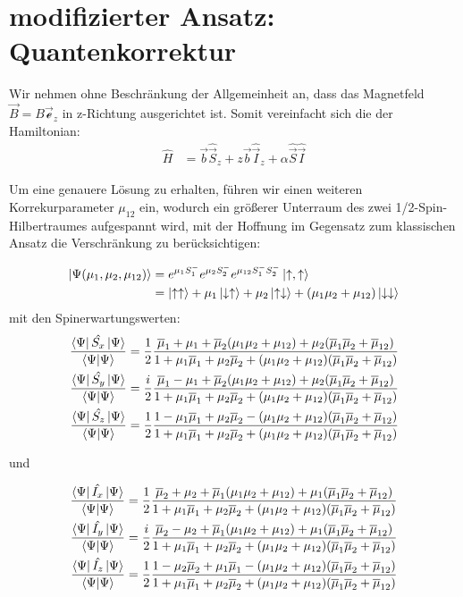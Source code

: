 \section{modifizierter Ansatz: Quantenkorrektur}

\noindent Wir nehmen ohne Beschränkung der Allgemeinheit an, dass das Magnetfeld $\vec{B}=B\vec{\mathcal{e}}_z$ in z-Richtung ausgerichtet ist. Somit vereinfacht sich die der Hamiltonian:
\begin{align}
    \hat{H} &= \vec{b}\hat{\vec{S}}_z +  z\vec{b}\hat{\vec{I}}_z + \alpha \hat{\vec{S}}\hat{\vec{I}}
\end{align}


\noindent Um eine genauere Lösung zu erhalten, führen wir einen weiteren Korrekurparameter $\mu_{12}$ ein, wodurch ein größerer Unterraum des zwei 1/2-Spin-Hilbertraumes aufgespannt wird, mit der Hoffnung im Gegensatz zum klassischen Ansatz die Verschränkung zu berücksichtigen:


\begin{align}
    \ket{\Psi(\mu_1,\mu_2,\mu_{12})} &= e^{\mu_1 S_1^-}e^{\mu_2 S_2^-}e^{\mu_{12} S_1^-S_2^-}\ket{\uparrow,\uparrow}\\
                                    &= \ket{\uparrow \uparrow} +\mu_1\ket{\downarrow \uparrow} + \mu_2\ket{\uparrow \downarrow} + (\mu_1\mu_2 + \mu_{12})\ket{\downarrow \downarrow}
\end{align}
mit den Spinerwartungswerten:
\begin{align}
    \frac{\bra{\Psi}\hat{S_x}\ket{\Psi}}{\bra{\Psi}\ket{\Psi}} &= \frac{1}{2}\frac{\overline{\mu}_1 + \mu_1 + \overline{\mu}_2(\mu_1\mu_2 + \mu_{12}) + \mu_2(\overline{\mu}_1\overline{\mu}_2 + \overline{\mu}_{12})}{1+\mu_1\overline{\mu}_1 + \mu_2\overline{\mu}_2 + (\mu_1\mu_2 + \mu_{12})(\overline{\mu}_1\overline{\mu}_2 + \overline{\mu}_{12})} \\
    \frac{\bra{\Psi}\hat{S_y}\ket{\Psi}}{\bra{\Psi}\ket{\Psi}} &= \frac{i}{2}\frac{\overline{\mu}_1 - \mu_1 + \overline{\mu}_2(\mu_1\mu_2 + \mu_{12}) + \mu_2(\overline{\mu}_1\overline{\mu}_2 + \overline{\mu}_{12})}{1+\mu_1\overline{\mu}_1 + \mu_2\overline{\mu}_2 + (\mu_1\mu_2 + \mu_{12})(\overline{\mu}_1\overline{\mu}_2 + \overline{\mu}_{12})}\\
    \frac{\bra{\Psi}\hat{S_z}\ket{\Psi}}{\bra{\Psi}\ket{\Psi}} &= \frac{1}{2}\frac{1 - \mu_1\overline{\mu}_1 + \mu_2\overline{\mu}_2 - (\mu_1\mu_2 + \mu_{12})(\overline{\mu}_1\overline{\mu}_2 + \overline{\mu}_{12})}{1 + \mu_1\overline{\mu}_1 + \mu_2\overline{\mu}_2 + (\mu_1\mu_2 + \mu_{12})(\overline{\mu}_1\overline{\mu}_2 + \overline{\mu}_{12})}  
\end{align}

und

\begin{align}
    \frac{\bra{\Psi}\hat{I_x}\ket{\Psi}}{\bra{\Psi}\ket{\Psi}} &= \frac{1}{2}\frac{\overline{\mu}_2 + \mu_2 + \overline{\mu}_1(\mu_1\mu_2 + \mu_{12}) + \mu_1(\overline{\mu}_1\overline{\mu}_2 + \overline{\mu}_{12})}{1+\mu_1\overline{\mu}_1 + \mu_2\overline{\mu}_2 + (\mu_1\mu_2 + \mu_{12})(\overline{\mu}_1\overline{\mu}_2 + \overline{\mu}_{12})} \\
    \frac{\bra{\Psi}\hat{I_y}\ket{\Psi}}{\bra{\Psi}\ket{\Psi}} &= \frac{i}{2}\frac{\overline{\mu}_2 - \mu_2 + \overline{\mu}_1(\mu_1\mu_2 + \mu_{12}) + \mu_1(\overline{\mu}_1\overline{\mu}_2 + \overline{\mu}_{12})}{1+\mu_1\overline{\mu}_1 + \mu_2\overline{\mu}_2 + (\mu_1\mu_2 + \mu_{12})(\overline{\mu}_1\overline{\mu}_2 + \overline{\mu}_{12})}\\
    \frac{\bra{\Psi}\hat{I_z}\ket{\Psi}}{\bra{\Psi}\ket{\Psi}} &= \frac{1}{2}\frac{1 - \mu_2\overline{\mu}_2 + \mu_1\overline{\mu}_1 - (\mu_1\mu_2 + \mu_{12})(\overline{\mu}_1\overline{\mu}_2 + \overline{\mu}_{12})}{1 + \mu_1\overline{\mu}_1 + \mu_2\overline{\mu}_2 + (\mu_1\mu_2 + \mu_{12})(\overline{\mu}_1\overline{\mu}_2 + \overline{\mu}_{12})}  
\end{align}


